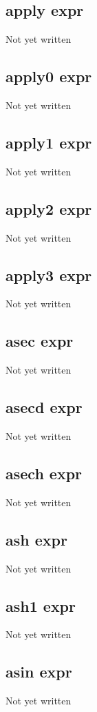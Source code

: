 \documentclass[a4paper,11pt]{article}
\begin{document}
\subsection{\ttfamily apply expr}
Not yet written

\subsection{\ttfamily apply0 expr}
Not yet written

\subsection{\ttfamily apply1 expr}
Not yet written

\subsection{\ttfamily apply2 expr}
Not yet written

\subsection{\ttfamily apply3 expr}
Not yet written

\subsection{\ttfamily asec expr}
Not yet written

\subsection{\ttfamily asecd expr}
Not yet written

\subsection{\ttfamily asech expr}
Not yet written

\subsection{\ttfamily ash expr}
Not yet written

\subsection{\ttfamily ash1 expr}
Not yet written

\subsection{\ttfamily asin expr}
Not yet written
\end{document}
